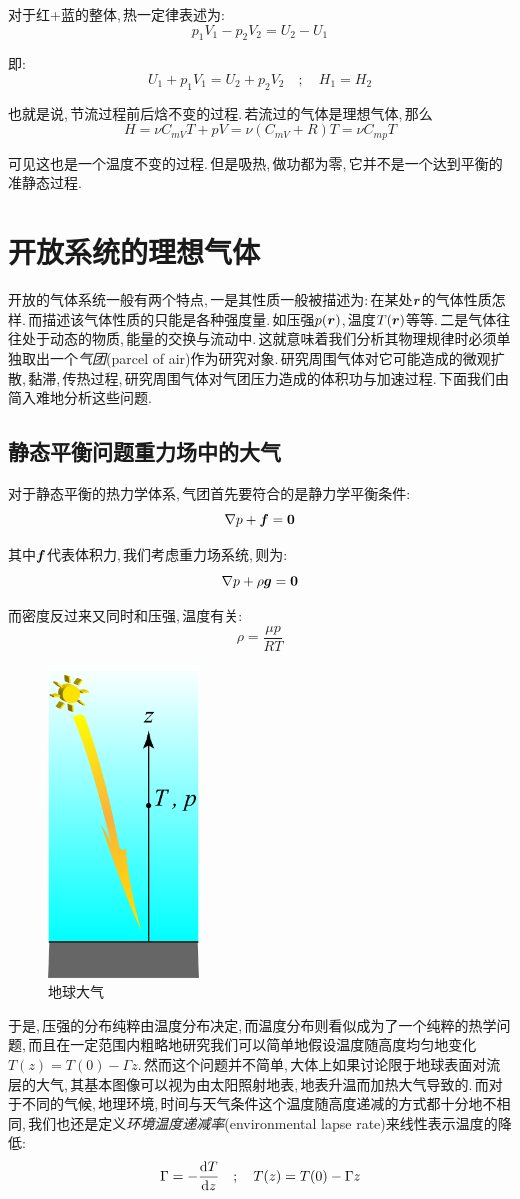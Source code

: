 对于红+蓝的整体,\,热一定律表述为:
\[p_1V_1-p_2V_2=U_2-U_1\]

即:
\[U_1+p_1V_1=U_2+p_2V_2\quad ;\quad H_1=H_2\]

也就是说,\,节流过程前后焓不变的过程.\,若流过的气体是理想气体,\,那么
\[H=\nu C_{mV}T+pV=\nu (C_{mV}+R)T=\nu C_{mp}T\]

可见这也是一个温度不变的过程.\,但是吸热,\,做功都为零,\,它并不是一个达到平衡的准静态过程.

\npg{-2cm}

\section{开放系统的理想气体}

开放的气体系统一般有两个特点,\,一是其性质一般被描述为:\,在某处$\boldsymbol{r}$的气体性质怎样.\,而描述该气体性质的只能是各种强度量.\,如压强$p(\boldsymbol{r})$,\,温度$T(\boldsymbol{r})$等等.\,二是气体往往处于动态的物质,\,能量的交换与流动中.\,这就意味着我们分析其物理规律时必须单独取出一个\emph{气团}(parcel of air)作为研究对象.\,研究周围气体对它可能造成的微观扩散,\,黏滞,\,传热过程,\,研究周围气体对气团压力造成的体积功与加速过程.\,下面我们由简入难地分析这些问题.

\subsection{静态平衡问题\ca 重力场中的大气}
对于静态平衡的热力学体系,\,气团首先要符合的是静力学平衡条件:
\[\nabla p+\boldsymbol{f}=\boldsymbol{0}\]

其中$\boldsymbol{f}$代表体积力,\,我们考虑重力场系统,\,则为:
\[\nabla p+\rho \boldsymbol{g}=\boldsymbol{0}\]

而密度反过来又同时和压强,\,温度有关:
\[\rho=\frac{\mu p}{RT}\]

\begin{figure}
\includegraphics[width=4cm]{image/5-1-10.png}
\caption{地球大气}
\end{figure}
于是,\,压强的分布纯粹由温度分布决定,\,而温度分布则看似成为了一个纯粹的热学问题,\,而且在一定范围内粗略地研究我们可以简单地假设温度随高度均匀地变化$T(z)=T(0)-\Gamma z$.\,然而这个问题并不简单,\,大体上如果讨论限于地球表面对流层的大气,\,其基本图像可以视为由太阳照射地表,\,地表升温而加热大气导致的.\,而对于不同的气候,\,地理环境,\,时间与天气条件这个温度随高度递减的方式都十分地不相同,\,我们也还是定义\emph{环境温度递减率}(environmental lapse rate)来线性表示温度的降低:
\[\Gamma=-\frac{\textrm{d} T}{\textrm{d} z} \quad;\quad T(z)=T(0)-\Gamma z\]

